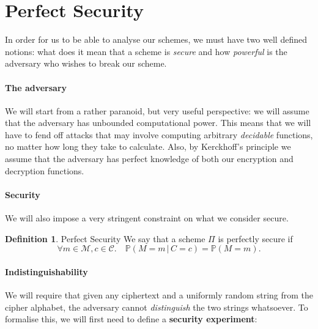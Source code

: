 \documentclass{article}
\theoremstyle{definition}
\newtheorem{definition}{Definition}[section]
\newcommand{\M}{\mathcal{M}}
\renewcommand{\C}{\mathcal{C}}
\newcommand{\Prob}{\mathbb{P}}
\begin{document}
\section{Perfect Security}
In order for us to be able to analyse our schemes, we must have two well defined
notions: what does it mean that a scheme is \textit{secure} and how \textit{powerful} is
the adversary who wishes to break our scheme.
\paragraph{The adversary} We will start from a rather
paranoid, but very useful perspective: we will assume that the adversary has
unbounded computational power. This means that we will have to fend off attacks
that may involve computing arbitrary \textit{decidable} functions, no matter how
long they take to calculate. Also, by Kerckhoff's principle we assume that the
adversary has perfect knowledge of both our encryption and decryption functions.
\paragraph{Security} We will also impose a very stringent constraint on what we
consider secure.
\begin{definition}{Perfect Security}
  \label{def:perfect_security}
We say that a scheme $\Pi$ is perfectly secure if
\[
  \forall m \in \M, c \in \C.\quad \Prob(M=m \,|\, C=c) = \Prob(M=m).
\]
\end{definition}
\paragraph{Indistinguishability} We will require that given any ciphertext and a uniformly
random string from the cipher alphabet, the adversary cannot
\textit{distinguish} the two strings whatsoever. To formalise this, we will
first need to define a \textbf{security experiment}:
\end{document}
